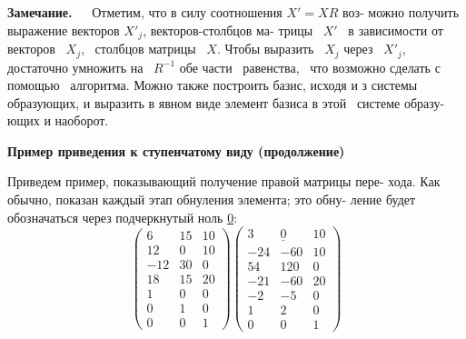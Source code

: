 	\begin{flushleft}
	\hangindent=1cm  \noindent
	{\small {\bf Замечание.}${\ \ \ \ \ \ \ }$Отметим, что в силу соотношения $X' = XR$ воз-\linebreak
		можно получить выражение векторов $X'_j$, векторов-столбцов ма-\linebreak
		трицы \  $X'$ \ в зависимости от векторов \ $X_j$, \ столбцов матрицы \ $X$.\linebreak
		Чтобы выразить \ $X_j$ через \ $X'_j$, достаточно умножить на \ $R^{-1}$ обе\linebreak
		части \ равенства, \ что возможно сделать с помощью \ алгоритма.\linebreak
		Можно также построить базис, исходя и з системы образующих,\linebreak
		и выразить в явном виде элемент базиса в этой \ системе образу-\linebreak
		ющих и наоборот.}
	\end{flushleft}
	
	\noindent
	{\bf Пример приведения к ступенчатому виду (продолжение)}
	
	Приведем пример, показывающий получение правой матрицы пере-\linebreak
	хода. Как обычно, показан каждый этап обнуления элемента; это обну-\linebreak
	ление будет обозначаться через подчеркнутый ноль \underline{0}:
	$$\begin{pmatrix} 6 & 15 & 10 \\ 12 & 0 & 10 \\ -12 & 30 & 0 \\ 18 & 15 & 20 \\ 1 & 0 & 0 \\ 0 & 1 & 0 \\ 0 & 0 & 1\end{pmatrix}\begin{pmatrix} 3 & \underline{0} & 10 \\ -24 & -60 & 10 \\ 54 & 120 & 0 \\ -21 & -60 & 20 \\ -2 & -5 & 0 \\ 1 & 2 & 0 \\ 0 & 0 & 1\end{pmatrix}$$
	
	\pagebreak
	
	
